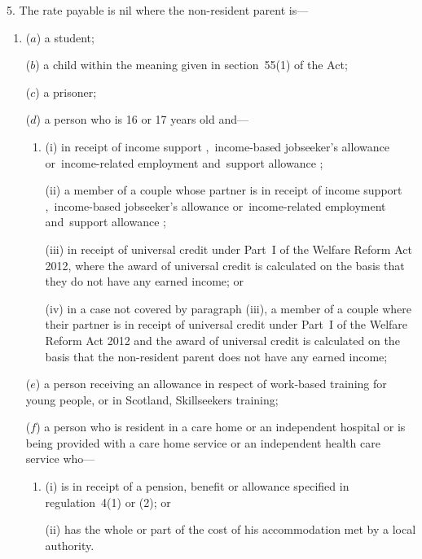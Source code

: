 \documentclass[12pt,a4paper]{article}
\begin{document}
5.  The rate payable is nil where the non-resident parent is—
\begin{enumerate}\item[]
($a$) a student;

($b$) a child within the meaning given in section~55(1) of the Act;

($c$) a prisoner;

($d$) a person who is 16 or 17 years old and—
\begin{enumerate}\item[]
(i) in receipt of income support%
,~income-based jobseeker’s allowance or~income-related employment and~support allowance%
; 

(ii) a member of a couple whose partner is in receipt of income support%
,~income-based jobseeker’s allowance or~income-related employment and~support allowance%
;

(iii) in receipt of universal credit under Part~I of the Welfare Reform Act 2012, where the award of universal credit is calculated on the basis that they do not have any earned income; or

(iv) in a case not covered by paragraph (iii), a member of a couple where their partner is in receipt of universal credit under Part~I of the Welfare Reform Act 2012 and the award of universal credit is calculated on the basis that the non-resident parent does not have any earned income;
\end{enumerate}

($e$) a person receiving an allowance in respect of work-based training for young people, or in Scotland, Skillseekers training;

($f$) a person 
who is resident in a care home or an independent hospital or is being provided with a care home service or an independent health care service  %
who—
\begin{enumerate}\item[]
(i) is in receipt of a pension, benefit or allowance specified in regulation~4(1) or (2); or

(ii) has the whole or part of the cost of his accommodation met by a local authority.
\end{enumerate}


\end{enumerate}
\end{document}
